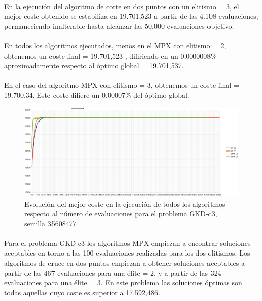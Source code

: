 	\paragraph{}En la ejecución del algoritmo de corte en dos puntos con un elitismo = 3, el mejor coste obtenido se estabiliza en 19.701,523 a partir de las 4.108 evaluaciones, permaneciendo inalterable hasta alcanzar las 50.000 evaluaciones objetivo.
	
	\paragraph{}En todos los algoritmos ejecutados, menos en el MPX con elitismo = 2, obtenemos un coste final = 19.701,523 , difiriendo en un 0,0000008\% aproximadamente respecto al óptimo global = 19.701,537.
	
	\paragraph{}En el caso del algoritmo MPX con elitismo = 3, obtenemos un coste final = 19.700,34. Este coste difiere un 0,00007\% del óptimo global.

	\begin{figure}[H]
		\centering
		\includegraphics[scale=0.3]{img/35608477_GKD-c_3_n500_m50.png}
		\caption{Evolución del mejor coste en la ejecución de todos los algoritmos respecto al número de evaluaciones para el problema GKD-c3, semilla 35608477}
		\label{gkd-c3_historico}
	\end{figure}

	\paragraph{}Para el problema GKD-c3 los algoritmos MPX empiezan a encontrar soluciones aceptables en torno a las 100 evaluaciones realizadas para los dos elitismos. Los algoritmos de cruce en dos puntos empiezan a obtener soluciones aceptables a partir de las 467 evaluaciones para una élite = 2, y a partir de las 324 evaluaciones para una élite = 3. En este problema las soluciones óptimas son todas aquellas cuyo coste es superior a 17.592,486.
	
